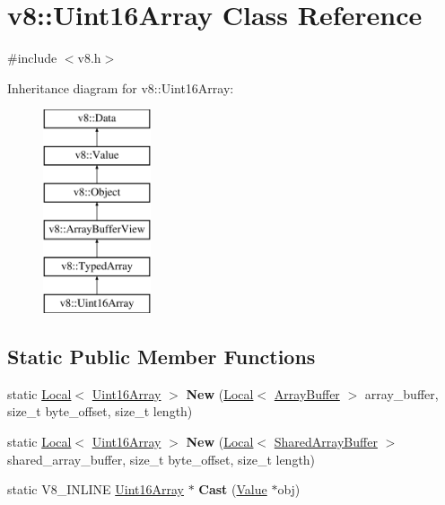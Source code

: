 \hypertarget{classv8_1_1_uint16_array}{}\section{v8\+:\+:Uint16\+Array Class Reference}
\label{classv8_1_1_uint16_array}


{\ttfamily \#include $<$v8.\+h$>$}

Inheritance diagram for v8\+:\+:Uint16\+Array\+:\begin{figure}[H]
\begin{center}
\leavevmode
\includegraphics[height=6.000000cm]{classv8_1_1_uint16_array}
\end{center}
\end{figure}
\subsection*{Static Public Member Functions}
\begin{DoxyCompactItemize}
\item 
static \hyperlink{classv8_1_1_local}{Local}$<$ \hyperlink{classv8_1_1_uint16_array}{Uint16\+Array} $>$ {\bfseries New} (\hyperlink{classv8_1_1_local}{Local}$<$ \hyperlink{classv8_1_1_array_buffer}{Array\+Buffer} $>$ array\+\_\+buffer, size\+\_\+t byte\+\_\+offset, size\+\_\+t length)\hypertarget{classv8_1_1_uint16_array_aa0aafae1f5a8ce1267174391c699bd20}{}\label{classv8_1_1_uint16_array_aa0aafae1f5a8ce1267174391c699bd20}

\item 
static \hyperlink{classv8_1_1_local}{Local}$<$ \hyperlink{classv8_1_1_uint16_array}{Uint16\+Array} $>$ {\bfseries New} (\hyperlink{classv8_1_1_local}{Local}$<$ \hyperlink{classv8_1_1_shared_array_buffer}{Shared\+Array\+Buffer} $>$ shared\+\_\+array\+\_\+buffer, size\+\_\+t byte\+\_\+offset, size\+\_\+t length)\hypertarget{classv8_1_1_uint16_array_a2e3f82cf34b770742b2ca8d7486573e2}{}\label{classv8_1_1_uint16_array_a2e3f82cf34b770742b2ca8d7486573e2}

\item 
static V8\+\_\+\+I\+N\+L\+I\+NE \hyperlink{classv8_1_1_uint16_array}{Uint16\+Array} $\ast$ {\bfseries Cast} (\hyperlink{classv8_1_1_value}{Value} $\ast$obj)\hypertarget{classv8_1_1_uint16_array_a84b017960621903a00ef2d912233ce34}{}\label{classv8_1_1_uint16_array_a84b017960621903a00ef2d912233ce34}

\end{DoxyCompactItemize}
